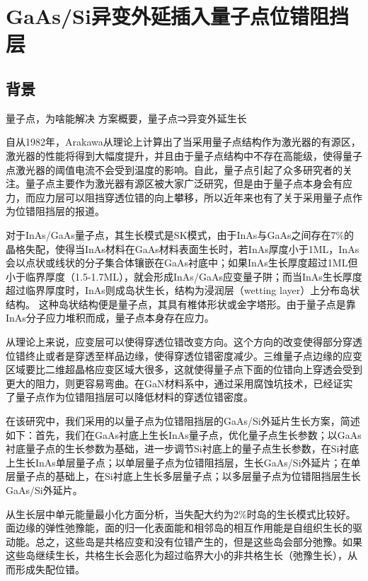 % 

\chapter{GaAs/Si异变外延插入量子点位错阻挡层}
\section{背景}
量子点，为啥能解决
方案概要，量子点⇒异变外延生长

自从1982年，Arakawa从理论上计算出了当采用量子点结构作为激光器的有源区，激光器的性能将得到大幅度提升，并且由于量子点结构中不存在高能级，使得量子点激光器的阈值电流不会受到温度的影响\cite{Arakawa1982}。自此，量子点引起了众多研究者的关注。量子点主要作为激光器有源区被大家广泛研究，但是由于量子点本身会有应力，而应力层可以阻挡穿透位错的向上攀移，所以近年来也有了关于采用量子点作为位错阻挡层的报道。

对于InAs/GaAs量子点，其生长模式是SK模式，由于InAs与GaAs之间存在7\%的晶格失配，使得当InAs材料在GaAs材料表面生长时，若InAs厚度小于1ML，InAs会以点状或线状的分子集合体镶嵌在GaAs衬底中\cite{Hill1995}；如果InAs生长厚度超过1ML但小于临界厚度（1.5-1.7ML），就会形成InAs/GaAs应变量子阱；而当InAs生长厚度超过临界厚度时，InAs则成岛状生长，结构为浸润层（wetting layer）上分布岛状结构\cite{Xiaoping1996}。 这种岛状结构便是量子点，其具有椎体形状或金字塔形\cite{Grundmann1995.11969}\cite{Grundmann1995.249}\cite{Cusack1996}。由于量子点是靠InAs分子应力堆积而成，量子点本身存在应力。

从理论上来说，应变层可以使得穿透位错改变方向。这个方向的改变使得部分穿透位错终止或者是穿透至样品边缘，使得穿透位错密度减少。三维量子点边缘的应变区域要比二维超晶格应变区域大很多，这就使得量子点下面的位错向上穿透会受到更大的阻力，则更容易弯曲。在GaN材料系中，通过采用腐蚀坑技术，已经证实了量子点作为位错阻挡层可以降低材料的穿透位错密度。

在该研究中，我们采用的以量子点为位错阻挡层的GaAs/Si外延片生长方案，简述如下：首先，我们在GaAs衬底上生长InAs量子点，优化量子点生长参数；以GaAs衬底量子点的生长参数为基础，进一步调节Si衬底上的量子点生长参数，在Si衬底上生长InAs单层量子点；以单层量子点为位错阻挡层，生长GaAs/Si外延片；在单层量子点的基础上，在Si衬底上生长多层量子点；以多层量子点为位错阻挡层生长GaAs/Si外延片。

从生长层中单元能量最小化方面分析，当失配大约为2\%时岛的生长模式比较好。面边缘的弹性弛豫能，面的归一化表面能和相邻岛的相互作用能是自组织生长的驱动能。总之，这些岛是共格应变和没有位错产生的，但是这些岛会部分弛豫。如果这些岛继续生长，共格生长会恶化为超过临界大小的非共格生长（弛豫生长），从而形成失配位错。


